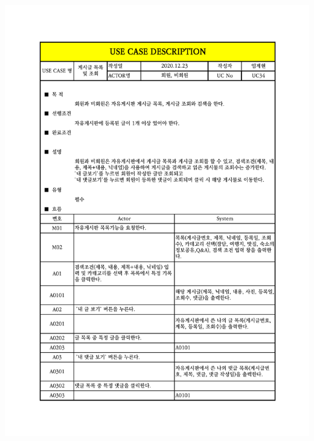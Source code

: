 {{{{{{{{{{{{{{{{{{{{{{{{{{{{{{{{{{{{\includegraphics[width=1.1\textwidth]{./Figure/Design/Display/usecase/034.pdf} \\
}}}}}}}}}}}}}}}}}}}}}}}}}}}}}}}}}}}}
